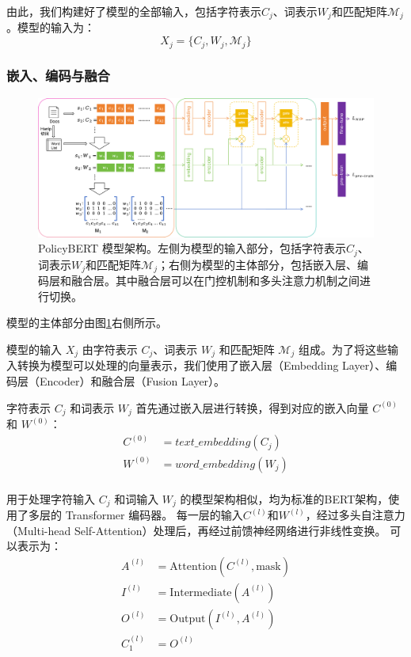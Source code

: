 \documentclass[12pt, a4paper]{ctexart}
\begin{document}
由此，我们构建好了模型的全部输入，包括字符表示$C_j$、词表示$W_j$和匹配矩阵${\mathcal{M}}_j$。模型的输入为：
\begin{equation}
        X_j = \{C_j, W_j, {\mathcal{M}}_j\}
\end{equation}

\subsubsection{嵌入、编码与融合}

\begin{figure}
    \centering
    \includegraphics[width=1\textwidth]{./images/model_structure.png}
    \caption{PolicyBERT 模型架构。左侧为模型的输入部分，包括字符表示$C_j$、词表示$W_j$和匹配矩阵${\mathcal{M}}_j$；右侧为模型的主体部分，包括嵌入层、编码层和融合层。其中融合层可以在门控机制和多头注意力机制之间进行切换。}
    \label{fig:policybert}
\end{figure}

模型的主体部分由图\ref{fig:policybert}右侧所示。

模型的输入 $X_j$ 由字符表示 $C_j$、词表示 $W_j$ 和匹配矩阵 ${\mathcal{M}}_j$ 组成。为了将这些输入转换为模型可以处理的向量表示，我们使用了嵌入层（Embedding Layer）、编码层（Encoder）和融合层（Fusion Layer）。

字符表示 $C_j$ 和词表示 $W_j$ 首先通过嵌入层进行转换，得到对应的嵌入向量 $C^{(0)}$ 和 $W^{(0)}$：
\begin{equation}
    \begin{split}
        C^{(0)} &= text\_embedding(C_j) \\
        W^{(0)} &= word\_embedding(W_j) \\
    \end{split}
\end{equation}

用于处理字符输入 $C_j$ 和词输入 $W_j$ 的模型架构相似，均为标准的BERT架构，使用了多层的 Transformer 编码器。
每一层的输入$C^{(l)}$和$W^{(l)}$，经过多头自注意力（Multi-head Self-Attention）处理后，再经过前馈神经网络进行非线性变换。
可以表示为：
\begin{equation}
    \begin{split}
        A^{(l)} &= \text{Attention}(C^{(l)}, \text{mask})\\
        I^{(l)} &= \text{Intermediate}(A^{(l)})\\
        O^{(l)} &= \text{Output}(I^{(l)}, A^{(l)})\\
        C^{(l)}_1 &= O^{(l)} \\
    \end{split}
\end{equation}
\end{document}
